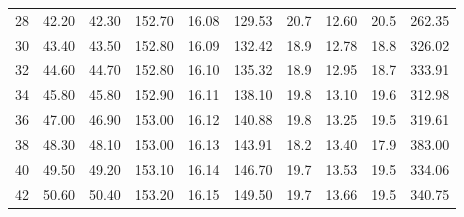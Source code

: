 \begin{table}[H]
\begin{adjustbox}{width=1.2\textwidth, center}
\begin{tabular}{S S[table-format=3.2] S[table-format=3.2] S[table-format=3.2] S[table-format=2.2] S[table-format=3.2] S[table-format=2.1] S[table-format=2.2] S[table-format=3.2] S[table-format=4.2]}
			28                 & 42.20               & 42.30               & 152.70                   & 16.08            & 129.53             & 20.7                             & 12.60                                & 20.5                             & 262.35                      \\
			30                 & 43.40               & 43.50               & 152.80                   & 16.09            & 132.42             & 18.9                             & 12.78                                & 18.8                             & 326.02                      \\
			32                 & 44.60               & 44.70               & 152.80                   & 16.10            & 135.32             & 18.9                             & 12.95                                & 18.7                             & 333.91                      \\
			34                 & 45.80               & 45.80               & 152.90                   & 16.11            & 138.10             & 19.8                             & 13.10                                & 19.6                             & 312.98                      \\
			36                 & 47.00               & 46.90               & 153.00                   & 16.12            & 140.88             & 19.8                             & 13.25                                & 19.5                             & 319.61                      \\
			38                 & 48.30               & 48.10               & 153.00                   & 16.13            & 143.91             & 18.2                             & 13.40                                & 17.9                             & 383.00                      \\
			40                 & 49.50               & 49.20               & 153.10                   & 16.14            & 146.70             & 19.7                             & 13.53                                & 19.5                             & 334.06                      \\
			42                 & 50.60               & 50.40               & 153.20                   & 16.15            & 149.50             & 19.7                             & 13.66                                & 19.5                             & 340.75                      \\

\end{tabular}
\end{adjustbox}
\end{table}
